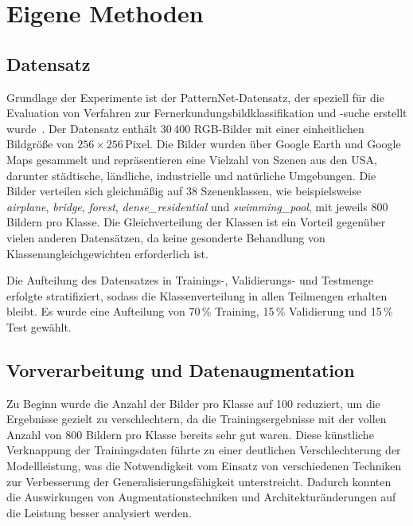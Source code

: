 \section{Eigene Methoden}
\label{sec:methode}

\subsection{Datensatz}
\label{subsec:datensatz}

Grundlage der Experimente ist der PatternNet-Datensatz, der speziell für die Evaluation von Verfahren zur Fernerkundungsbildklassifikation und -suche erstellt wurde~\cite{zhou2018patternnet}.
Der Datensatz enthält 30\,400 RGB-Bilder mit einer einheitlichen Bildgröße von $256 \times 256$\,Pixel.
Die Bilder wurden über Google Earth und Google Maps gesammelt und repräsentieren eine Vielzahl von Szenen aus den USA, darunter städtische, ländliche, industrielle und natürliche Umgebungen.
Die Bilder verteilen sich gleichmäßig auf 38 Szenenklassen, wie beispielsweise \textit{airplane}, \textit{bridge}, \textit{forest}, \textit{dense\_residential} und \textit{swimming\_pool}, mit jeweils 800 Bildern pro Klasse.
Die Gleichverteilung der Klassen ist ein Vorteil gegenüber vielen anderen Datensätzen, da keine gesonderte Behandlung von Klassenungleichgewichten erforderlich ist.

Die Aufteilung des Datensatzes in Trainings-, Validierungs- und Testmenge erfolgte stratifiziert, sodass die Klassenverteilung in allen Teilmengen erhalten bleibt.
Es wurde eine Aufteilung von 70\,\% Training, 15\,\% Validierung und 15\,\% Test gewählt.

\subsection{Vorverarbeitung und Datenaugmentation}
\label{subsec:augmentation}

Zu Beginn wurde die Anzahl der Bilder pro Klasse auf 100 reduziert, um die Ergebnisse gezielt zu verschlechtern, da die Trainingsergebnisse mit der vollen Anzahl von 800 Bildern pro Klasse bereits sehr gut waren.
Diese künstliche Verknappung der Trainingsdaten führte zu einer deutlichen Verschlechterung der Modellleistung, was die Notwendigkeit vom Einsatz von verschiedenen Techniken zur Verbesserung der Generalisierungsfähigkeit unterstreicht.
Dadurch konnten die Auswirkungen von Augmentationstechniken und Architekturänderungen auf die Leistung besser analysiert werden.

